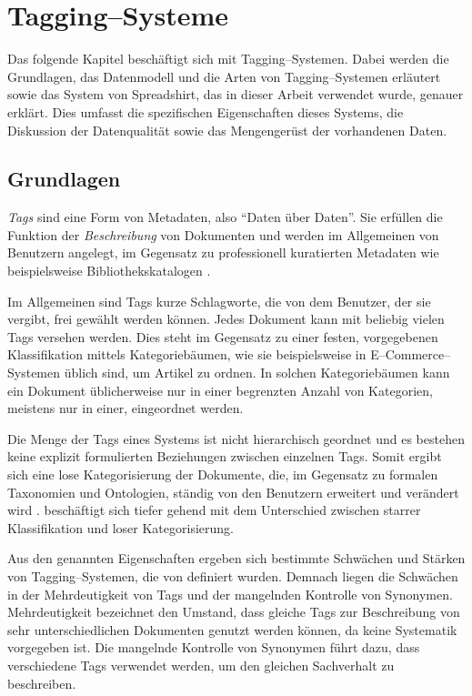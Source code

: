 \chapter{Tagging--Systeme}
\label{tagging}

Das folgende Kapitel beschäftigt sich mit Tagging--Systemen. Dabei werden die Grundlagen, das Datenmodell und die Arten von Tagging--Systemen erläutert sowie das System von Spreadshirt, das in dieser Arbeit verwendet wurde, genauer erklärt. Dies umfasst die spezifischen Eigenschaften dieses Systems, die Diskussion der Datenqualität sowie das Mengengerüst der vorhandenen Daten.

\section{Grundlagen}
\label{tagging_basics}

\emph{Tags} sind eine Form von Metadaten, also ``Daten über Daten''. Sie erfüllen die Funktion der \emph{Beschreibung} von Dokumenten und werden im Allgemeinen von Benutzern angelegt, im Gegensatz zu professionell kuratierten Metadaten wie beispielsweise Bibliothekskatalogen \cite{ma2004}.

Im Allgemeinen sind Tags kurze Schlagworte, die von dem Benutzer, der sie vergibt, frei gewählt werden können. Jedes Dokument kann mit beliebig vielen Tags versehen werden. Dies steht im Gegensatz zu einer festen, vorgegebenen Klassifikation mittels Kategoriebäumen, wie sie beispielsweise in E--Commerce--Systemen üblich sind, um Artikel zu ordnen. In solchen Kategoriebäumen kann ein Dokument üblicherweise nur in einer begrenzten Anzahl von Kategorien, meistens nur in einer, eingeordnet werden.

Die Menge der Tags eines Systems ist nicht hierarchisch geordnet und es bestehen keine explizit formulierten Beziehungen zwischen einzelnen Tags. Somit ergibt sich eine lose Kategorisierung der Dokumente, die, im Gegensatz zu formalen Taxonomien und Ontologien, ständig von den Benutzern erweitert und verändert wird \cite{sc2005}. \textcite{je2004} beschäftigt sich tiefer gehend mit dem Unterschied zwischen starrer Klassifikation und loser Kategorisierung.

Aus den genannten Eigenschaften ergeben sich bestimmte Schwächen und Stärken von Tagging--Systemen, die von \textcite{ma2004} definiert wurden. Demnach liegen die Schwächen in der Mehrdeutigkeit von Tags und der mangelnden Kontrolle von Synonymen. Mehrdeutigkeit bezeichnet den Umstand, dass gleiche Tags zur Beschreibung von sehr unterschiedlichen Dokumenten genutzt werden können, da keine Systematik vorgegeben ist. Die mangelnde Kontrolle von Synonymen führt dazu, dass verschiedene Tags verwendet werden, um den gleichen Sachverhalt zu beschreiben.

